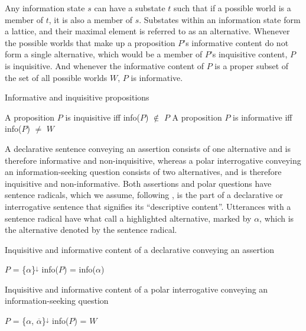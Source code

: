 \documentclass[output=paper,colorlinks,citecolor=brown            ,chinesefont]{langscibook}
\begin{document}

Any information state $s$ can have a substate $t$ such that if a possible world is a member of $t$, it is also a member of $s$. Substates within an information state form a lattice, and their maximal element is referred to as an alternative. Whenever the possible worlds that make up a proposition $P$'s informative content do not form a single alternative, which would be a member of $P$'s inquisitive content, $P$ is inquisitive. And whenever the informative content of $P$ is a proper subset of the set of all possible worlds $W$, $P$ is informative. 

\begin{exe}
\ex\label{inqdef} Informative and inquisitive propositions
\begin{xlist}
\ex\label{inqdefa} A proposition $P$ is inquisitive iff info($P$) $\notin$ $P$
\ex\label{inqdefb} A proposition $P$ is informative iff info($P$) $\neq$ $W$
\hfill \citep[23]{Ciardelli+2018}
\end{xlist}
\end{exe}

A declarative sentence conveying an assertion consists of one alternative and is therefore informative and non-inquisitive, whereas a polar interrogative conveying an information-seeking question consists of two alternatives, and is therefore inquisitive and non-informative. Both assertions and polar questions have sentence radicals, which we assume, following \citet{Stenius1967}, is the part of a declarative or interrogative sentence that signifies its ``descriptive content''. Utterances with a sentence radical have what \citet{Farkas+2017} call a highlighted alternative, marked by \textbf{$\alpha$}, which is the alternative denoted by the sentence radical.

\begin{exe}
\ex\label{intdecI} Inquisitive and informative content of a declarative conveying an assertion 
\begin{xlist}
\ex\label{intdec1} $P$ = \{\textbf{$\alpha$}\}$^{\downarrow}$
\ex\label{intdec2} info($P$) = info($\alpha$)
\end{xlist}
\ex\label{intdecII} Inquisitive and informative content of a polar interrogative conveying an information-seeking question
\begin{xlist}
\ex\label{intdec3} $P$ = \{\textbf{$\alpha$}, $\overline{\alpha}$\}$^{\downarrow}$
\ex\label{intdec4} info($P$) = $W$
\end{xlist}
\end{exe}
\end{document}

